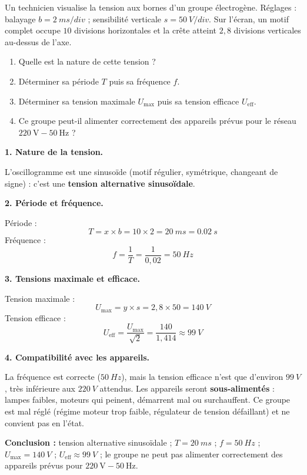 \documentclass[11pt]{article}
\begin{document}
\begin{exoresolu}
Un technicien visualise la tension aux bornes d'un groupe électrogène. Réglages : balayage $b = \SI{2}{ms/div}$ ; sensibilité verticale $s = \SI{50}{V/div}$. Sur l'écran, un motif complet occupe $10$ divisions horizontales et la crête atteint $2,8$ divisions verticales au-dessus de l'axe.
\begin{enumerate}
\item Quelle est la nature de cette tension ?
\item Déterminer sa période $T$ puis sa fréquence $f$.
\item Déterminer sa tension maximale $U_{\text{max}}$ puis sa tension efficace $U_{\text{eff}}$.
\item Ce groupe peut-il alimenter correctement des appareils prévus pour le réseau $220\ \text{V} - 50\ \text{Hz}$ ?
\end{enumerate}
\tcblower
\textbf{1. Nature de la tension.}

L'oscillogramme est une sinusoïde (motif régulier, symétrique, changeant de signe) : c'est une \textbf{tension alternative sinusoïdale}.

\textbf{2. Période et fréquence.}

Période :
\[ T = x \times b = 10 \times 2 = \SI{20}{ms} = \SI{0,02}{s} \]
Fréquence :
\[ f = \dfrac{1}{T} = \dfrac{1}{0,02} = \SI{50}{Hz} \]

\textbf{3. Tensions maximale et efficace.}

Tension maximale :
\[ U_{\text{max}} = y \times s = 2,8 \times 50 = \SI{140}{V} \]
Tension efficace :
\[ U_{\text{eff}} = \dfrac{U_{\text{max}}}{\sqrt{2}} = \dfrac{140}{1,414} \approx \SI{99}{V} \]

\textbf{4. Compatibilité avec les appareils.}

La fréquence est correcte ($\SI{50}{Hz}$), mais la tension efficace n'est que d'environ $\SI{99}{V}$, très inférieure aux $\SI{220}{V}$ attendus. Les appareils seront \textbf{sous-alimentés} : lampes faibles, moteurs qui peinent, démarrent mal ou surchauffent. Ce groupe est mal réglé (régime moteur trop faible, régulateur de tension défaillant) et ne convient pas en l'état.

\textbf{Conclusion :} tension alternative sinusoïdale ; $T = \SI{20}{ms}$ ; $f = \SI{50}{Hz}$ ; $U_{\text{max}} = \SI{140}{V}$ ; $U_{\text{eff}} \approx \SI{99}{V}$ ; le groupe ne peut pas alimenter correctement des appareils prévus pour $220\ \text{V} - 50\ \text{Hz}$.
\end{exoresolu}
\end{document}
